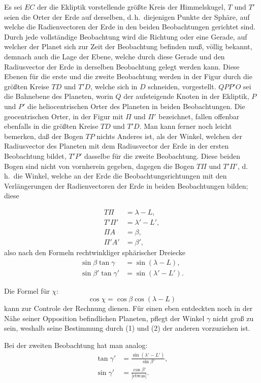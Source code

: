 \documentclass[12pt,a4paper]{article}
\theoremstyle{plain}
\theoremstyle{definition}
\theoremstyle{remark}
\begin{document}
Es sei $EC$ der die Ekliptik vorstellende größte Kreis der Himmelskugel, $T$ und $T'$ seien die Orter der Erde auf derselben, d.\,h.\ diejenigen Punkte der Sphäre, auf welche die Radienvectoren der Erde in den beiden Beobachtungen gerichtet sind. Durch jede vollständige Beobachtung wird die Richtung oder eine Gerade, auf welcher der Planet sich zur Zeit der Beobachtung befinden muß, völlig bekannt, demnach auch die Lage der Ebene, welche durch diese Gerade und den Radiusvector der Erde in derselben Beobachtung gelegt werden kann. Diese Ebenen für die erste und die zweite Beobachtung werden in der Figur durch die größten Kreise $TD$ und $T'D$, welche sich in $D$ schneiden, vorgestellt. $QPP'O$ sei die Bahnebene des Planeten, worin $Q$ der aufsteigende Knoten in der Ekliptik, $P$ und $P'$ die heliocentrischen Orter des Planeten in beiden Beobachtungen. Die geocentrischen Orter, in der Figur mit $\Pi$ und $\Pi'$ bezeichnet, fallen offenbar ebenfalls in die größten Kreise $TD$ und $T'D$. Man kann ferner noch leicht bemerken, daß der Bogen $TP$ nichts Anderes ist, als der Winkel, welchen der Radiusvector des Planeten mit dem Radiusvector der Erde in der ersten Beobachtung bildet, $T'P'$ dasselbe für die zweite Beobachtung. Diese beiden Bogen sind nicht von vornherein gegeben, dagegen die Bogen $T\Pi$ und $T'\Pi'$, d.\,h.\ die Winkel, welche an der Erde die Beobachtungsrichtungen mit den Verlängerungen der Radienvectoren der Erde in beiden Beobachtungen bilden; diese

\begin{align*}
T\Pi &= \lambda - L, \\
T'\Pi' &= \lambda' - L', \\
\Pi A &= \beta, \\
\Pi' A' &= \beta',
\end{align*}
also nach den Formeln rechtwinkliger sphärischer Dreiecke
\begin{align}
\sin\beta \tan\gamma &= \sin(\lambda - L), \tag{1}\\
\sin\beta' \tan\gamma' &= \sin(\lambda' - L'). \tag{2}
\end{align}

Die Formel für $\chi$:
\[
\cos\chi = \cos\beta\cos(\lambda - L)
\]
kann zur Controle der Rechnung dienen. Für einen eben entdeckten noch in der Nähe seiner Opposition befindlichen Planeten, pflegt der Winkel $\gamma$ nicht groß zu sein, weshalb seine Bestimmung durch (1) und (2) der anderen vorzuziehen ist.

Bei der zweiten Beobachtung hat man analog:
\begin{align}
\tan\gamma' &= \frac{\sin(\lambda' - L')}{\sin\beta'}, \tag{3}\\
\sin\gamma' &= \frac{\cos\beta'}{\text{[etwas]}}. \tag{4}
\end{align}
\end{document}

